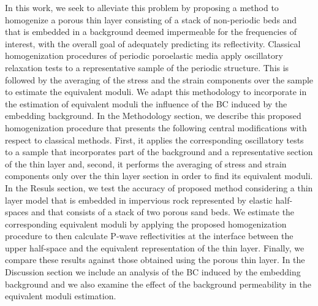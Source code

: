 \documentclass[draft]{agujournal2019}
\begin{document}

In this work, we seek to alleviate this problem by proposing a method to homogenize a porous thin layer consisting of a stack of non-periodic beds and that is embedded in a background deemed impermeable for the frequencies of interest, with the overall goal of adequately predicting its reflectivity. Classical homogenization procedures of periodic poroelastic media apply oscillatory relaxation tests to a representative sample of the periodic structure. This is followed by the averaging of the stress and the strain components over the sample to estimate the equivalent moduli. We adapt this methodology to incorporate in the estimation of equivalent moduli the influence of the BC induced by the embedding background.
In the Methodology section, we describe this proposed homogenization procedure that presents the following central modifications with respect to classical methods. First, it applies the corresponding oscillatory tests to a sample that incorporates part of the background and a representative section of the 
thin layer and, second, it performs the averaging of stress and strain components only over the thin layer section in order to find its equivalent moduli. In the Resuls section, we
test the accuracy of proposed method considering a thin layer model that is embedded in impervious rock represented by elastic half-spaces and that consists of a stack of two  porous sand beds. We estimate the corresponding equivalent moduli by applying the proposed homogenization procedure to then calculate P-wave reflectivities at the interface between the upper half-space and the equivalent representation of the thin  layer. Finally, we compare these results against those obtained using the porous thin layer. In the Discussion section we include an analysis of the BC induced by the embedding background and we also examine the effect of the background permeability in the equivalent moduli  estimation.
\end{document}
